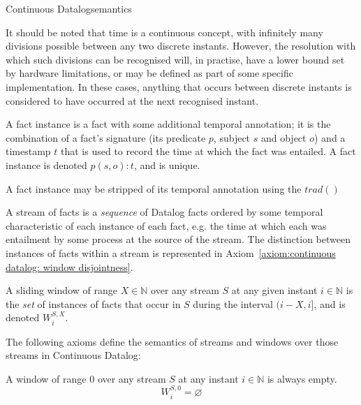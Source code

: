 \begin{nestedsection}{Continuous Datalog}{semantics}
\begin{definition}[Instant]
It should be noted that time is a continuous concept, with infinitely many divisions possible between any two discrete instants.
However, the resolution with which such divisions can be recognised will, in practise, have a lower bound set by hardware limitations, or may be defined as part of some specific implementation.
In these cases, anything that occurs between discrete instants is considered to have occurred at the next recognised instant.
\end{definition}

\begin{definition}\label{def:continuous datalog: fact instance}
A fact instance is a fact with some additional temporal annotation; it
is the combination of a fact's signature (its predicate $p$, subject $s$
and object $o$) and a timestamp $t$ that is used to record the time at
which the fact was entailed. A fact instance is denoted ${p(s,o):t}$,
and is unique.
\end{definition}

\begin{definition}[]\label{def:continuous datalog: trad}
A fact instance may be stripped of its temporal annotation using the $trad()$
\end{definition}

\begin{definition}\label{def:continuous datalog: stream}
A stream of facts is a \emph{sequence} of Datalog facts ordered by
some temporal characteristic of each instance of each fact, e.g. the
time at which each was entailment by some process at the source of the
stream.  The distinction between instances of facts within a
stream is represented in Axiom~\ref{axiom:continuous datalog: window disjointness}.
\end{definition}

\begin{definition}\label{def:continuous datalog: window}
A sliding window of range ${X \in \mathbb{N}}$ over any stream $S$ at
any given instant ${i \in \mathbb{N}}$ is the \emph{set} of instances
of facts that occur in $S$ during the interval ${(i-X,i]}$, and is
  denoted ${W^{S,X}_{i}}$.
\end{definition}

The following axioms define the semantics of streams and windows over
those streams in Continuous Datalog:

\begin{axiom}\label{axiom:continuous datalog: window range leq 0}
A window of range $0$ over any stream $S$ at any instant 
${i \in \mathbb{N}}$ is always empty.
\begin{equation*}
W^{S,0}_{i} = \varnothing
\end{equation*}
\end{axiom}


\end{nestedsection}
